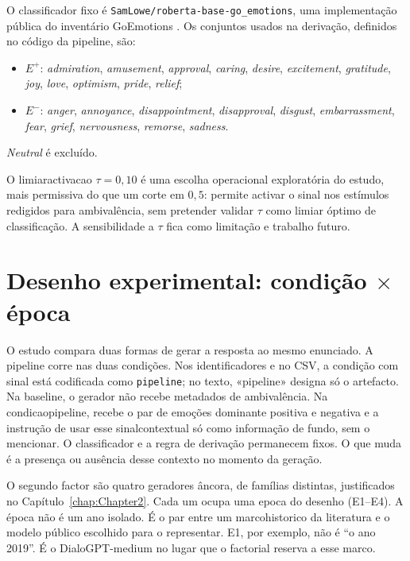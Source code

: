O classificador fixo é \texttt{SamLowe/roberta-base-go\_emotions}, uma implementação pública do inventário GoEmotions \parencite{Demszky2020GoEmotions}. Os conjuntos usados na derivação, definidos no código da \gls{pipeline}, são:
\begin{itemize}
 \item \(E^+\): \textit{admiration}, \textit{amusement}, \textit{approval}, \textit{caring}, \textit{desire}, \textit{excitement}, \textit{gratitude}, \textit{joy}, \textit{love}, \textit{optimism}, \textit{pride}, \textit{relief};
 \item \(E^-\): \textit{anger}, \textit{annoyance}, \textit{disappointment}, \textit{disapproval}, \textit{disgust}, \textit{embarrassment}, \textit{fear}, \textit{grief}, \textit{nervousness}, \textit{remorse}, \textit{sadness}.
\end{itemize}
\textit{Neutral} é excluído.

O \gls{limiaractivacao} \(\tau = 0{,}10\) é uma escolha operacional exploratória do estudo, mais permissiva do que um corte em \(0{,}5\): permite activar o sinal nos estímulos redigidos para ambivalência, sem pretender validar \(\tau\) como limiar óptimo de classificação. A sensibilidade a \(\tau\) fica como limitação e trabalho futuro.


\section{Desenho experimental: condição \texorpdfstring{\(\times\)}{x} época}
\label{sec:desenho}

O estudo compara duas formas de gerar a resposta ao mesmo enunciado. A \gls{pipeline} corre nas duas condições. Nos identificadores e no CSV, a condição com sinal está codificada como \texttt{pipeline}; no texto, «pipeline» designa só o artefacto. Na \gls{baseline}, o gerador não recebe metadados de ambivalência. Na \gls{condicaopipeline}, recebe o par de emoções dominante positiva e negativa e a instrução de usar esse \gls{sinalcontextual} só como informação de fundo, sem o mencionar. O classificador e a regra de derivação permanecem fixos. O que muda é a presença ou ausência desse contexto no momento da geração.

O segundo factor são quatro geradores âncora, de famílias distintas, justificados no Capítulo~\ref{chap:Chapter2}. Cada um ocupa uma \gls{epoca} do desenho (E1--E4). A época não é um ano isolado. É o par entre um \gls{marcohistorico} da literatura e o modelo público escolhido para o representar. E1, por exemplo, não é ``o ano 2019''. É o DialoGPT-medium no lugar que o factorial reserva a esse marco.

